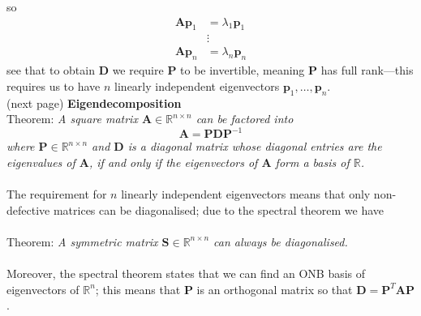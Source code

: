 \documentclass{report}
\begin{document}
so\begin{align*}
\bm{A}\bm{p}_1&=\lambda_1\bm{p}_1\\
&\vdots\\
\bm{A}\bm{p}_n&=\lambda_n\bm{p}_n
\end{align*}
see that to obtain $\bm{D}$ we require $\bm{P}$ to be invertible, meaning $\bm{P}$ 
has full rank---this requires us to have $n$ linearly independent eigenvectors $\bm{p}_1,\ldots,\bm{p}_n$.\\
(next page)
\newpage
\noindent\textbf{Eigendecomposition}\\
Theorem: \textit{A square matrix $\bm{A}\in\mathbb{R}^{n\times n}$ can be factored into}
\begin{equation*}
\bm{A}=\bm{PDP}^{-1}
\end{equation*}
\textit{where $\bm{P}\in\mathbb{R}^{n\times n}$ and $\bm{D}$ is a diagonal matrix whose diagonal entries are the 
eigenvalues of $\bm{A}$, if and only if the eigenvectors of $\bm{A}$ form a basis of $\mathbb{R}$.}\\
\vspace{1mm}\\
The requirement for $n$ linearly independent eigenvectors means that only non-defective matrices can be
diagonalised; due to the spectral theorem we have\\
\vspace{1mm}\\
Theorem: \textit{A symmetric matrix $\bm{S}\in\mathbb{R}^{n\times n}$ can always be diagonalised.}\\
\vspace{1mm}\\
Moreover, the spectral theorem states that we can find an ONB basis of eigenvectors of $\mathbb{R}^n$; 
this means that $\bm{P}$ is an orthogonal matrix so that
$\bm{D}=\bm{P}^T\bm{AP}$.
\newpage
\end{document}
